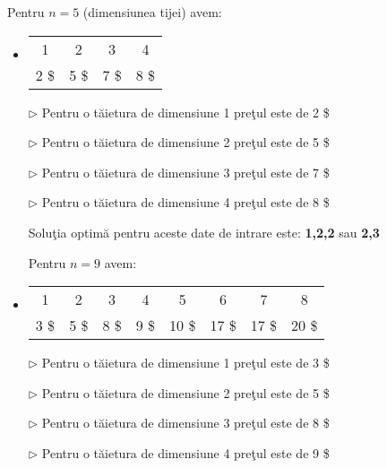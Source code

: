 \documentclass{article}
\begin{document}
\par \qquad{}  Pentru $ n=5 $ (dimensiunea tijei) avem:
\begin{itemize}
\item \begin{tabular}{c|c|c|c|}
    1 & 2 & 3 & 4   \\
    2 \$ & 5 \$ & 7 \$ & 8 \$
\end{tabular} 


\par $\triangleright $ Pentru o t\u{a}ietura de dimensiune 1 pre\c{t}ul este de 2 \$
\newline
\par $\triangleright $ Pentru o t\u{a}ietura de dimensiune 2 pre\c{t}ul este de 5 \$
\newline
\par $\triangleright $ Pentru o t\u{a}ietura de dimensiune 3 pre\c{t}ul este de 7 \$
\newline
\par $\triangleright $ Pentru o t\u{a}ietura de dimensiune 4 pre\c{t}ul este de 8 \$
\newline

\par \qquad Solu\c{t}ia optim\u{a} pentru aceste date de intrare este: \textbf{1,2,2} sau \textbf{2,3}

\par \qquad {} Pentru $ n=9 $ avem:
\newline
\item \begin{tabular}{c|c|c|c|c|c|c|c|}
     1 & 2 & 3 & 4 & 5 & 6 & 7 & 8  \\
     3 \$ & 5 \$ & 8 \$ & 9 \$ & 10 \$ & 17 \$ & 17 \$ & 20 \$  
\end{tabular}

\par $\triangleright $ Pentru o t\u{a}ietura de dimensiune 1 pre\c{t}ul este de 3 \$
\newline
\par $\triangleright $ Pentru o t\u{a}ietura de dimensiune 2 pre\c{t}ul este de 5 \$
\newline
\par $\triangleright $ Pentru o t\u{a}ietura de dimensiune 3 pre\c{t}ul este de 8 \$
\newline
\par $\triangleright $ Pentru o t\u{a}ietura de dimensiune 4 pre\c{t}ul este de 9 \$
\newline


\end{itemize}
\end{document}
